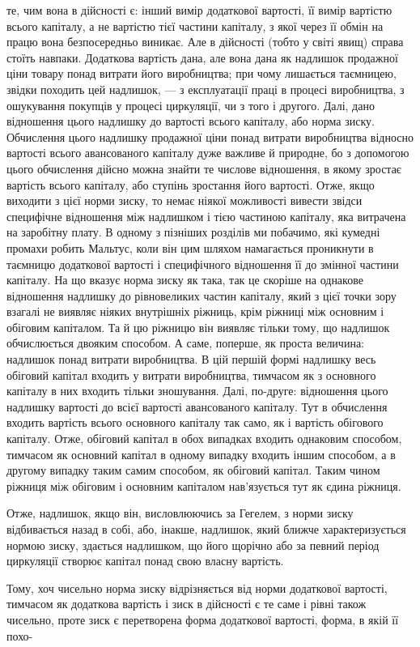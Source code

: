 те, чим вона в дійсності є: інший вимір додаткової вартості,
її вимір вартістю всього капіталу, а не вартістю тієї частини
капіталу, з якої через її обмін на працю вона безпосередньо
виникає. Але в дійсності (тобто у світі явищ) справа стоїть навпаки.
Додаткова вартість дана, але вона дана як надлишок продажної
ціни товару понад витрати його виробництва; при чому
лишається таємницею, звідки походить цей надлишок, — з експлуатації
праці в процесі виробництва, з ошукування покупців
у процесі циркуляції, чи з того і другого. Далі, дано відношення
цього надлишку до вартості всього капіталу, або
норма зиску. Обчислення цього надлишку продажної ціни понад
витрати виробництва відносно вартості всього авансованого капіталу
дуже важливе й природне, бо з допомогою цього обчислення
дійсно можна знайти те числове відношення, в якому
зростає вартість всього капіталу, або ступінь зростання його
вартості. Отже, якщо виходити з цієї норми зиску, то немає
ніякої можливості вивести звідси специфічне відношення між
надлишком і тією частиною капіталу, яка витрачена на заробітну
плату. В одному з пізніших розділів ми побачимо, які кумедні
промахи робить Мальтус, коли він цим шляхом намагається
проникнути в таємницю додаткової вартості і специфічного відношення
її до змінної частини капіталу. На що вказує норма
зиску як така, так це скоріше на однакове відношення надлишку
до рівновеликих частин капіталу, який з цієї точки зору взагалі
не виявляє ніяких внутрішніх ріжниць, крім ріжниці між основним
і обіговим капіталом. Та й цю ріжницю він виявляє тільки
тому, що надлишок обчислюється двояким способом. А саме,
поперше, як проста величина: надлишок понад витрати виробництва.
В цій першій формі надлишку весь обіговий капітал входить
у витрати виробництва, тимчасом як з основного капіталу
в них входить тільки зношування. Далі, по-друге: відношення
цього надлишку вартості до всієї вартості авансованого капіталу.
Тут в обчислення входить вартість всього основного капіталу
так само, як і вартість обігового капіталу. Отже, обіговий
капітал в обох випадках входить однаковим способом, тимчасом
як основний капітал в одному випадку входить іншим
способом, а в другому випадку таким самим способом, як обіговий
капітал. Таким чином ріжниця між обіговим і основним капіталом
нав’язується тут як єдина ріжниця.

Отже, надлишок, якщо він, висловлюючись за Гегелем, з норми
зиску відбивається назад в собі, або, інакше, надлишок, який
ближче характеризується нормою зиску, здається надлишком,
що його щорічно або за певний період циркуляції створює капітал
понад свою власну вартість.

Тому, хоч чисельно норма зиску відрізняється від норми додаткової
вартості, тимчасом як додаткова вартість і зиск в
дійсності є те саме і рівні також чисельно, проте зиск є перетворена
форма додаткової вартості, форма, в якій її похо-
